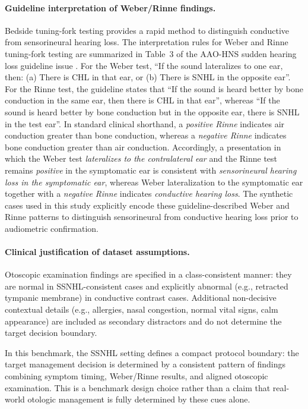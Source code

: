 \documentclass[twocolumn]{article}
\begin{document}
\paragraph{Guideline interpretation of Weber/Rinne findings.}
Bedside tuning-fork testing provides a rapid method to distinguish conductive
from sensorineural hearing loss. The interpretation rules for Weber and Rinne
tuning-fork testing are summarized in Table~3 of the AAO-HNS sudden hearing
loss guideline issue \parencite{guidelinecentral_sshl}. For the Weber test, ``If
the sound lateralizes to one ear, then: (a) There is CHL in that ear, or (b)
There is SNHL in the opposite ear''. For the Rinne test, the guideline states
that ``If the sound is heard better by bone conduction in the same ear, then
there is CHL in that ear'', whereas ``If the sound is heard better by bone
conduction but in the opposite ear, there is SNHL in the test ear''. In standard
clinical shorthand, a \textit{positive Rinne} indicates air conduction greater
than bone conduction, whereas a \textit{negative Rinne} indicates bone
conduction greater than air conduction. Accordingly, a presentation in which the
Weber test \textit{lateralizes to the contralateral ear} and the Rinne test
remains \textit{positive} in the symptomatic ear is consistent with
\textit{sensorineural hearing loss in the symptomatic ear}, whereas Weber
lateralization to the symptomatic ear together with a \textit{negative Rinne}
indicates \textit{conductive hearing loss}. The synthetic cases used in this
study explicitly encode these guideline-described Weber and Rinne patterns to
distinguish sensorineural from conductive hearing loss prior to audiometric
confirmation.

\paragraph{Clinical justification of dataset assumptions.}
Otoscopic examination findings are specified in a class-consistent manner: they
are normal in SSNHL-consistent cases and explicitly abnormal (e.g., retracted
tympanic membrane) in conductive contrast cases. Additional non-decisive
contextual details (e.g., allergies, nasal congestion, normal vital signs, calm
appearance) are included as secondary distractors and do not determine the
target decision boundary.

In this benchmark, the SSNHL setting defines a compact protocol boundary: the
target management decision is determined by a consistent pattern of findings
combining symptom timing, Weber/Rinne results, and aligned otoscopic
examination. This is a benchmark design choice rather than a claim that
real-world otologic management is fully determined by these cues alone.
\end{document}
